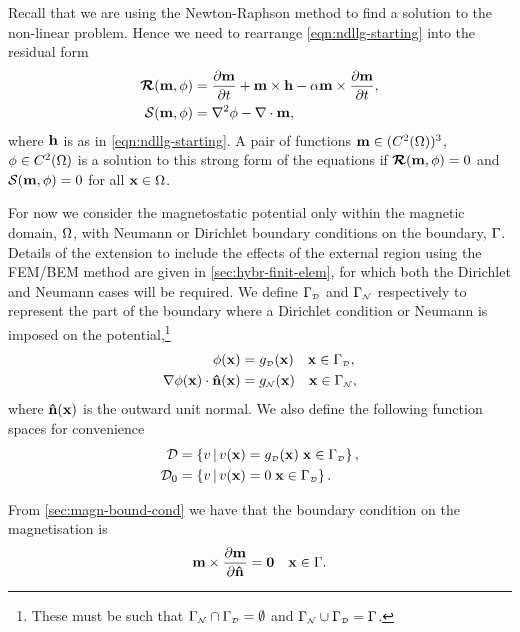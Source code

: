 Recall that we are using the Newton-Raphson method to find a solution to the non-linear problem.
Hence we need to rearrange \cref{eqn:ndllg-starting} into the residual form
\begin{align}
  \label{eq:llgR}
  \Rllg(\mv, \phim) &= \dmdt + \mv \times \hv - \dampc \mv \times \dmdt,  \\
  \Rphi(\mv, \phim) &= \lap \phim - \div \mv, \label{eq:phiR}
\end{align}
where $\boldsymbol{\mathrm{h}}$ is as in \cref{eqn:ndllg-starting}.
A pair of functions $\boldsymbol{\mathrm{m}} \in (C^2(\Omega))^3$, $\phi \in C^2(\Omega)$ is a solution to this strong form of the equations if $\boldsymbol{\mathrm{\mathcal{R}}}(\boldsymbol{\mathrm{m}}, \phi)=0$ and $\mathcal{S}(\boldsymbol{\mathrm{m}}, \phi)=0$ for all $\boldsymbol{\mathrm{x}} \in \Omega$.

For now we consider the magnetostatic potential only within the magnetic domain, $\Omega$, with Neumann or Dirichlet boundary conditions on the boundary, ${\Gamma}$.
Details of the extension to include the effects of the external region using the FEM/BEM method are given in \cref{sec:hybr-finit-elem}, for which both the Dirichlet and Neumann cases will be required.
We define ${\Gamma}_{\scriptscriptstyle{\mathcal{D}}}$ and ${\Gamma}_{\scriptscriptstyle{\mathcal{N}}}$ respectively to represent the part of the boundary where a Dirichlet condition or Neumann is imposed on the potential,\footnote{These must be such that ${\Gamma}_{\scriptscriptstyle{\mathcal{N}}} \cap {\Gamma}_{\scriptscriptstyle{\mathcal{D}}} = \emptyset$ and ${\Gamma}_{\scriptscriptstyle{\mathcal{N}}} \cup {\Gamma}_{\scriptscriptstyle{\mathcal{D}}} = {\Gamma}$.} \ie
\begin{equation}
  \begin{aligned}
    \phi(\boldsymbol{\mathrm{x}}) &= g_{\scriptscriptstyle{\mathcal{D}}}(\boldsymbol{\mathrm{x}}) \quad  \boldsymbol{\mathrm{x}} \in {\Gamma}_{\scriptscriptstyle{\mathcal{D}}}, \\
    \nabla \phi(\boldsymbol{\mathrm{x}}) \cdot \boldsymbol{\mathrm{\hat{n}}}(\boldsymbol{\mathrm{x}}) &= g_{\scriptscriptstyle{\mathcal{N}}}(\boldsymbol{\mathrm{x}}) \quad  \boldsymbol{\mathrm{x}} \in {\Gamma}_{\scriptscriptstyle{\mathcal{N}}},
  \end{aligned}
\end{equation}
where $\boldsymbol{\mathrm{\hat{n}}}(\boldsymbol{\mathrm{x}})$ is the outward unit normal.
We also define the following function spaces for convenience
\begin{equation}
\begin{aligned}
  \label{eq:037}
  \Dfs & = \setst{ v }{ v(\xv) = g_\Dir(\xv) \;  \xv \in \boundd_\Dir }, \\
  \Dfs_0 &= \setst{ v }{ v(\xv) = 0 \;  \xv \in \boundd_\Dir }.
\end{aligned}
\end{equation}

From \cref{sec:magn-bound-cond} we have that the boundary condition on the magnetisation is
\begin{equation}
  \label{eq:m-bc}
  \mv \times \dmdn = \zerov \quad \xv \in \boundd.
\end{equation}


